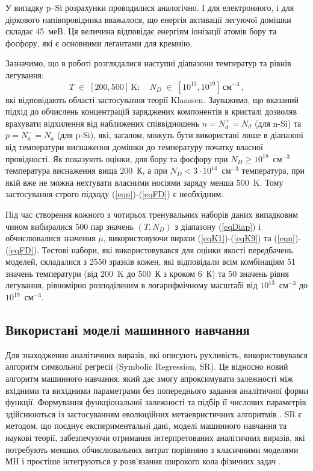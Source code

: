 \documentclass[fleqn,twoside,twocolumn,nofootinbib,showkeys]{revtex4} %
\begin{document}
У випадку p--Si розрахунки проводилися аналогічно.
І для електронного, і для діркового напівпровідника вважалося, що енергія активації легуючої домішки складає 45~меВ.
Ця величина відповідає енергіям іонізації атомів бору та фосфору, які є основними легантами для кремнію.

Зазначимо, що в роботі розглядалися наступні діапазони температур та рівнів легування:
\begin{equation}\label{eqDiap}
  T\;\in\;[200,500]\,\text{K};\quad N_D\;\in\;[10^{13},10^{19}]\,\text{см}^{-3}\,,
\end{equation}
які відповідають області застосування теорії Klaassen.
Зауважимо, що вказаний підхід до обчислень концентрацій заряджених компонентів в кристалі дозволяв врахувати
відхилення від наближених співвідношень  $n=N_d^+=N_d$ (для n-Si) та $p=N_a^-=N_a$ (для p-Si),
які, загалом, можуть бути використані лише в діапазоні від температури виснаження домішки до температуру початку власної провідності.
Як показують оцінки, для бору та фосфору при $N_D\geq10^{18}$~см$^{-3}$ температура виснаження вища 200~К,
а при  $N_D<3\cdot10^{14}$~см$^{-3}$ температура, при якій вже не можна нехтувати власними носіями заряду менша 500~K.
Тому застосування строго підходу (\ref{eqn})-(\ref{eqFD}) є необхідним.


Під час створення кожного з чотирьох тренувальних наборів даних випадковим чином вибиралися 500 пар значень $(T,N_D)$ з діапазону (\ref{eqDiap}) і
обчислювалися значення $\mu$, використовуючи вирази (\ref{eqK1})-(\ref{eqK9}) та (\ref{eqn})-(\ref{eqFD}).
Тестові набори, які використовувався для оцінки якості передбачень моделей, складалися з 2550 зразків кожен, які
відповідали всім комбінаціям 51 значень температури (від 200~K до 500~К з кроком 6~К) та 50 значень рівня легування, рівномірно розподіленим
в логарифмічному масштабі від $10^{13}$~см$^{-3}$ до $10^{19}$~см$^{-3}$.

\subsection{Використані моделі машинного навчання}

Для знаходження аналітичних виразів, які описують рухливість, використовувався алгоритм символьної регресії (Symbolic Regression, SR).
Це відносно новий алгоритм машинного навчання, який дає змогу апроксимувати залежності між вхідними та вихідними параметрами
без попереднього задання аналітичної форми функції.
Формування функціональної залежності та підбір її числових параметрів здійснюються із застосуванням еволюційних метаевристичних алгоритмів \cite{Angelis2023}.
SR є методом, що поєднує експериментальні дані, моделі машинного навчання та наукові теорії,
забезпечуючи отримання інтерпретованих аналітичних виразів, які потребують менших обчислювальних витрат порівняно
з класичними моделями МН і простіше інтегруються у розв’язання широкого кола фізичних задач \cite{Angelis2023,Hruska2025,Davis2023,Mengel2023,Li2023}.
\end{document}
